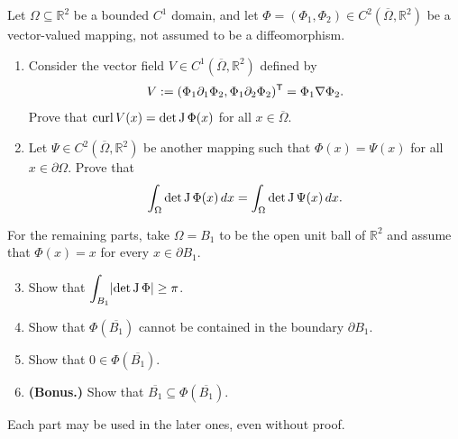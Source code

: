 \begin{exercise}
\label{ex:curl_identity_greens_formula}
Let $\Omega \subseteq \mathbb{R}^2$ be a bounded $C^1$ domain, and let $\Phi = (\Phi_1, \Phi_2) \in C^2(\overline{\Omega}, \mathbb{R}^2)$ be a vector-valued mapping, not assumed to be a diffeomorphism.
\begin{enumerate}[label=\textbf{(\alph*)}]
  \item Consider the vector field $V \in C^1(\overline{\Omega}, \mathbb{R}^2)$ defined by
  \[V := (\Phi_1 \partial_1 \Phi_2, \Phi_1 \partial_2 \Phi_2)^{\mathsf{T}} = \Phi_1 \nabla \Phi_2.\]
  Prove that $\operatorname{curl} V(x) = \det \operatorname{J}\Phi(x)$ for all $x \in \overline{\Omega}$.
  \item Let $\Psi \in C^2(\overline{\Omega}, \mathbb{R}^2)$ be another mapping such that $\Phi(x) = \Psi(x)$ for all $x \in \partial \Omega$. Prove that
  \[\int_\Omega \det \operatorname{J}\Phi(x) \, dx = \int_\Omega \det \operatorname{J}\Psi(x) \, dx.\]
\end{enumerate}
For the remaining parts, take $\Omega = B_1$ to be the open unit ball of $\mathbb{R}^2$ and assume
that $\Phi(x) = x$ for every $x \in \partial B_1$.
\begin{enumerate}[label=\textbf{(\alph*)}]
  \setcounter{enumi}{2}
  \item Show that $\displaystyle\int_{B_1} \lvert\det\operatorname{J}\Phi\rvert \geq \pi$.
  \item Show that $\Phi(\overline{B_1})$ cannot be contained in the boundary $\partial B_1$.
  \item Show that $0 \in \Phi(\overline{B_1})$.
  \item \textbf{(Bonus.)} Show that $\overline{B_1} \subseteq \Phi(\overline{B_1})$.
\end{enumerate}
Each part may be used in the later ones, even without proof.
\end{exercise}

